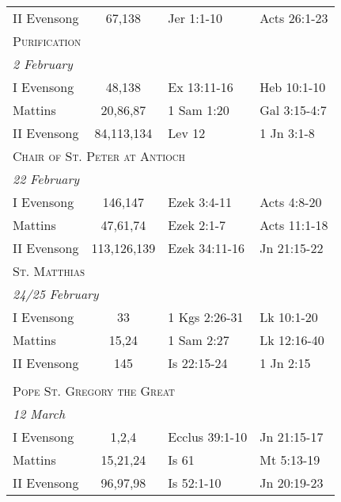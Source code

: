 \begin{longtable}{l c l l}
\hspace{1em} II Evensong&67,138&Jer 1:1-10&Acts 26:1-23\\
\multicolumn{4}{l}{\textsc{Purification}}\\
\multicolumn{4}{l}{\textit{2 February}}\\
\hspace{1em} I Evensong&48,138&Ex 13:11-16&Heb 10:1-10\\
\hspace{1em} Mattins&20,86,87&1 Sam 1:20&Gal 3:15-4:7\\
\hspace{1em} II Evensong&84,113,134&Lev 12&1 Jn 3:1-8\\
\multicolumn{4}{l}{\textsc{Chair of St. Peter at Antioch}}\\
\multicolumn{4}{l}{\textit{22 February}}\\
\hspace{1em} I Evensong&146,147&Ezek 3:4-11&Acts 4:8-20\\
\hspace{1em} Mattins&47,61,74&Ezek 2:1-7&Acts 11:1-18\\
\hspace{1em} II Evensong&113,126,139&Ezek 34:11-16&Jn 21:15-22\\
\multicolumn{4}{l}{\textsc{St. Matthias}}\\
\multicolumn{4}{l}{\textit{24/25 February}}\\
\hspace{1em} I Evensong&33&1 Kgs 2:26-31&Lk 10:1-20\\
\hspace{1em} Mattins&15,24&1 Sam 2:27&Lk 12:16-40\\
\hspace{1em} II Evensong&145&Is 22:15-24&1 Jn 2:15\\
\\
\multicolumn{4}{l}{\textsc{Pope St. Gregory the Great}}\\
\multicolumn{4}{l}{\textit{12 March}}\\
\hspace{1em} I Evensong&1,2,4&Ecclus 39:1-10&Jn 21:15-17\\
\hspace{1em} Mattins&15,21,24&Is 61&Mt 5:13-19\\
\hspace{1em} II Evensong&96,97,98&Is 52:1-10&Jn 20:19-23\\

\end{longtable}
